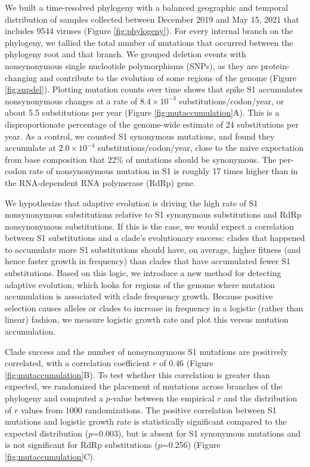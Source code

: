 \documentclass[11pt,oneside,letterpaper]{article}
\begin{document}
We built a time-resolved phylogeny with a balanced geographic and temporal distribution of samples collected between December 2019 and May 15, 2021 that includes 9544 viruses (Figure \ref{fig:phylogeny}).
For every internal branch on the phylogeny, we tallied the total number of mutations that occurred between the phylogeny root and that branch.
We grouped deletion events with nonsynonymous single nucleotide polymorphisms (SNPs), as they are protein-changing and contribute to the evolution of some regions of the genome (Figure \ref{fig:snpdel}).
Plotting mutation counts over time shows that spike S1 accumulates nonsynonymous changes at a rate of $8.4 \times 10^{-3}$ substitutions/codon/year, or about 5.5 substitutions per year (Figure \ref{fig:mutaccumulation}A).
This is a disproportionate percentage of the genome-wide estimate of 24 substitutions per year.
As a control, we counted S1 synonymous mutations, and found they accumulate at $2.0 \times 10^{-4}$ substitutions/codon/year, close to the naive expectation from base composition that 22\% of mutations should be synonymous.
The per-codon rate of nonsynonymous mutation in S1 is roughly 17 times higher than in the RNA-dependent RNA polymerase (RdRp) gene.

We hypothesize that adaptive evolution is driving the high rate of S1 nonsynonymous substitutions relative to S1 synonymous substitutions and RdRp nonsynonymous substitutions.
If this is the case, we would expect a correlation between S1 substitutions and a clade's evolutionary success: clades that happened to accumulate more S1 substitutions should have, on average, higher fitness (and hence faster growth in frequency) than clades that have accumulated fewer S1 substitutions.
Based on this logic, we introduce a new method for detecting adaptive evolution, which looks for regions of the genome where mutation accumulation is associated with clade frequency growth.
Because positive selection causes alleles or clades to increase in frequency in a logistic (rather than linear) fashion, we measure logistic growth rate and plot this versus mutation accumulation.

Clade success and the number of nonsynonymous S1 mutations are positively correlated, with a correlation coefficient $r$ of 0.46 (Figure \ref{fig:mutaccumulation}B).
To test whether this correlation is greater than expected, we randomized the placement of mutations across branches of the phylogeny and computed a $p$-value between the empirical $r$ and the distribution of $r$ values from 1000 randomizations.
The positive correlation between S1 mutations and logistic growth rate is statistically significant compared to the expected distribution ($p$=0.003), but is absent for S1 synonymous mutations and is not significant for RdRp substitutions ($p$=0.256) (Figure \ref{fig:mutaccumulation}C).
\end{document}
